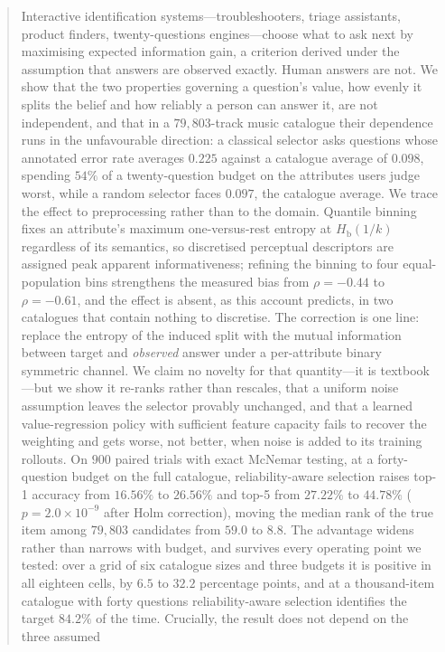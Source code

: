 \begin{abstract}
Interactive identification systems---troubleshooters, triage assistants,
product finders, twenty-questions engines---choose what to ask next by
maximising expected information gain, a criterion derived under the assumption
that answers are observed exactly. Human answers are not. We show that the two
properties governing a question's value, how evenly it splits the belief and
how reliably a person can answer it, are not independent, and that in a
$79{,}803$-track music catalogue their dependence runs in the unfavourable
direction: a classical selector asks questions whose annotated error rate
averages $0.225$ against a catalogue average of $0.098$, spending $54\%$ of a
twenty-question budget on the attributes users judge worst, while a random
selector faces $0.097$, the catalogue average. We trace the effect to
preprocessing rather than to the domain. Quantile binning fixes an attribute's
maximum one-versus-rest entropy at $H_{\mathrm b}(1/k)$ regardless of its
semantics, so discretised perceptual descriptors are assigned peak apparent
informativeness; refining the binning to four equal-population bins strengthens
the measured bias from $\rho=-0.44$ to $\rho=-0.61$, and the effect is absent,
as this account predicts, in two catalogues that contain nothing to discretise.
The correction is one line: replace the entropy of the induced split with the
mutual information between target and \emph{observed} answer under a
per-attribute binary symmetric channel. We claim no novelty for that
quantity---it is textbook---but we show it re-ranks rather than rescales, that a
uniform noise assumption leaves the selector provably unchanged, and that a
learned value-regression policy with sufficient feature capacity fails to
recover the weighting and gets worse, not better, when noise is added to its
training rollouts. On $900$ paired trials with exact McNemar testing, at a
forty-question budget on the full catalogue, reliability-aware selection raises
top-1 accuracy from $16.56\%$ to $26.56\%$ and top-5 from $27.22\%$ to
$44.78\%$ ($p = 2.0\times10^{-9}$ after Holm correction), moving the median
rank of the true item among $79{,}803$ candidates from $59.0$ to $8.8$. The
advantage widens rather than narrows with budget, and survives every operating
point we tested: over a grid of six catalogue sizes and three budgets it is
positive in all eighteen cells, by $6.5$ to $32.2$ percentage points, and at a
thousand-item catalogue with forty questions reliability-aware selection
identifies the target $84.2\%$ of the time. Crucially, the result does not depend on the three assumed

\end{abstract}

